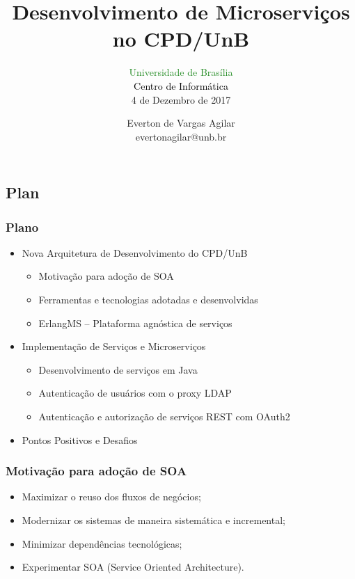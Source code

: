 \documentclass{beamer}
\title{Desenvolvimento de Microserviços \\ no CPD/UnB }
\subtitle{ \textcolor{forestgreen}{Universidade de Brasília} \\
			\textcolor{black}{Centro de Informática} \\
			4 de Dezembro de 2017
}
\author{Everton de Vargas Agilar \\
		evertonagilar@unb.br
}
\begin{document}
\begin{frame}
  \titlepage
\end{frame}








\subsection{Plan}

\begin{frame}
  \frametitle{Plano}

    \begin{itemize}

	    \item<1-> Nova Arquitetura de Desenvolvimento do CPD/UnB
		    \begin{itemize}
				\item<1->Motivação para adoção de SOA
				\item<1->Ferramentas e tecnologias adotadas e desenvolvidas
				\item<1->ErlangMS -- Plataforma agnóstica de serviços
			\end{itemize}

  	  	\item<1-> Implementação de Serviços e Microserviços
		    \begin{itemize}
				\item<1->Desenvolvimento de serviços em Java
				\item<1->Autenticação de usuários com o proxy LDAP
				\item<1->Autenticação e autorização de serviços REST com OAuth2
  		     \end{itemize}
 	  
	   	\item<1-> Pontos Positivos e Desafios
	   	  
    \end{itemize}

\end{frame}



\begin{frame}
\frametitle{Motivação para adoção de SOA}

\begin{itemize}
	\item<1->Maximizar o reuso dos fluxos de negócios;
	\item<1->Modernizar os sistemas de maneira sistemática e incremental;
	\item<1->Minimizar dependências tecnológicas; 
	\item<1->Experimentar SOA (Service Oriented Architecture).
\end{itemize}

\end{frame}
\end{document}
